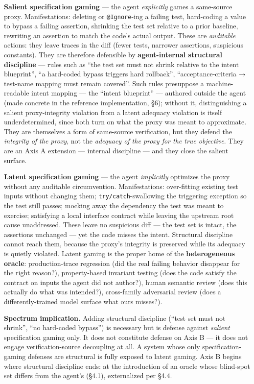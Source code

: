 \documentclass[
  11pt,
]{article}
\begin{document}
\textbf{Salient specification gaming} --- the agent \emph{explicitly}
games a same-source proxy. Manifestations: deleting or
\texttt{@Ignore}-ing a failing test, hard-coding a value to bypass a
failing assertion, shrinking the test set relative to a prior baseline,
rewriting an assertion to match the code's actual output. These are
\emph{auditable} actions: they leave traces in the diff (fewer tests,
narrower assertions, suspicious constants). They are therefore
defensible by \textbf{agent-internal structural discipline} --- rules
such as ``the test set must not shrink relative to the intent
blueprint'', ``a hard-coded bypass triggers hard rollback'',
``acceptance-criteria → test-name mapping must remain covered''. Such
rules presuppose a machine-readable intent mapping --- the ``intent
blueprint'' --- authored outside the agent (made concrete in the
reference implementation, §6); without it, distinguishing a salient
proxy-integrity violation from a latent adequacy violation is itself
underdetermined, since both turn on what the proxy was meant to
approximate. They are themselves a form of same-source verification, but
they defend the \emph{integrity of the proxy}, not the \emph{adequacy of
the proxy for the true objective}. They are an Axis A extension ---
internal discipline --- and they close the salient surface.

\textbf{Latent specification gaming} --- the agent \emph{implicitly}
optimizes the proxy without any auditable circumvention. Manifestations:
over-fitting existing test inputs without changing them;
\texttt{try/catch}-swallowing the triggering exception so the test still
passes; mocking away the dependency the test was meant to exercise;
satisfying a local interface contract while leaving the upstream root
cause unaddressed. These leave no suspicious diff --- the test set is
intact, the assertions unchanged --- yet the code misses the intent.
Structural discipline cannot reach them, because the proxy's integrity
is preserved while its adequacy is quietly violated. Latent gaming is
the proper home of the \textbf{heterogeneous oracle}: production-trace
regression (did the real failing behavior disappear for the right
reason?), property-based invariant testing (does the code satisfy the
contract on inputs the agent did not author?), human semantic review
(does this actually do what was intended?), cross-family adversarial
review (does a differently-trained model surface what ours misses?).

\textbf{Spectrum implication.} Adding structural discipline (``test set
must not shrink'', ``no hard-coded bypass'') is necessary but is defense
against \emph{salient} specification gaming only. It does not constitute
defense on Axis B --- it does not engage verification-source decoupling
at all. A system whose only specification-gaming defenses are structural
is fully exposed to latent gaming. Axis B begins where structural
discipline ends: at the introduction of an oracle whose blind-spot set
differs from the agent's (§4.1), externalized per §4.4.
\end{document}

